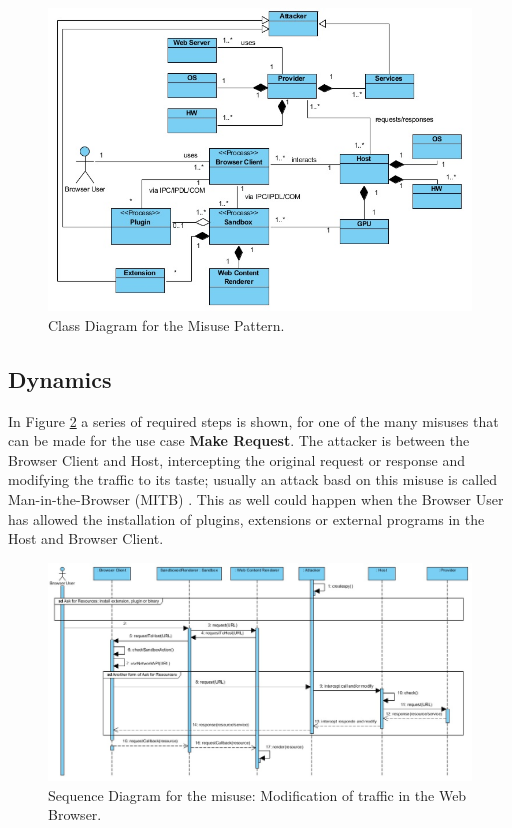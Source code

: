 \documentclass{sig-alternate-05-2015}
\begin{document}
\begin{figure}[h!t]
  \centering
  \includegraphics[scale=0.85]{figures/patronMisuse_v6.jpg}
  \caption{Class Diagram for the Misuse Pattern.}
  \label{fig:BIMisuse}
\end{figure}

\subsection*{Dynamics}
In Figure \ref{fig:SeqMisuse} a series of required steps is shown, for one of the many misuses that can be made for the use case \textbf{Make Request}. The attacker is between the Browser Client and Host, intercepting the original request or response and modifying the traffic to its taste; usually an attack basd on this misuse is called Man-in-the-Browser (MITB) \cite{Liu2012, Barth2010, Utakrit2009, Dougan2012}. This as well could happen when the Browser User has allowed the installation of plugins, extensions or external programs in the Host and Browser Client.

\begin{figure}[h!t]
  \centering
  \includegraphics[scale=0.61]{figures/MakeRequestMisuse.jpg}
  \caption{Sequence Diagram for the misuse: Modification of traffic in the Web Browser.}
  \label{fig:SeqMisuse}
\end{figure}
\end{document}
